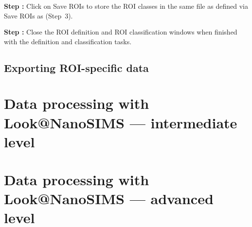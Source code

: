 \documentclass[a4paper, 11pt]{article}
\newcommand{\lans}[1]{{\color{magenta}#1}}
\newcommand\addon[1]{-- {\small #1}}
\newcounter{step}
\newcommand\s{\addtocounter{step}{1}\noindent\textbf{Step \thestep:}{ }}
\begin{document}
\s Click on \lans{Save ROIs} to store the ROI classes in the same file as defined via \lans{Save ROIs as} (Step~3).

\s Close the ROI definition and ROI classification windows when finished with the definition and classification tasks.


\subsection{Exporting ROI-specific data}





\section{Data processing with Look@NanoSIMS --- intermediate level}
\label{sec:level2}


\section{Data processing with Look@NanoSIMS --- advanced level}
\label{sec:level3}


\end{document}
